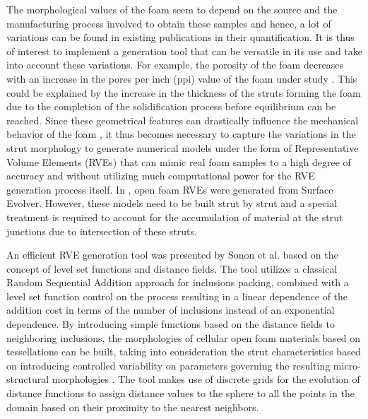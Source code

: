 The morphological values of the foam seem to depend on the source and the manufacturing process involved to obtain these samples and hence, a lot of variations can be found in existing publications in their quantification. It is thus of interest to implement a generation tool that can be versatile in its use and take into account these variations. For example, the porosity of the foam decreases with an increase in the pores per inch (ppi) value of the foam under study \cite{jungMicrostructuralCharacterisationExperimental2017}. This could be explained by the increase in the thickness of the struts forming the foam due to the completion of the solidification process before equilibrium can be reached. {Since these geometrical features can drastically influence the mechanical behavior of the foam \cite{jungMicrostructuralCharacterisationExperimental2017,gongCompressiveResponseOpencell2005}, it thus becomes necessary to capture the variations in the strut morphology to generate numerical models under the form of Representative Volume Elements (RVEs) that can mimic real foam samples to a high degree of accuracy and without utilizing much computational power for the RVE generation process itself.} {In \cite{jangCompressiveStrengthOpencell2010}, open foam RVEs were generated from Surface Evolver. However, these models need to be built strut by strut and a special treatment is required to account for the accumulation of material at the strut junctions due to intersection of these struts.}

An efficient RVE generation tool was presented by Sonon et al. \cite{sononUnifiedLevelSet2012} based on the concept of level set functions and distance fields. The tool utilizes a classical Random Sequential Addition approach for inclusions packing, combined with a level set function control on the process resulting in a linear dependence of the addition cost  in terms of the number of inclusions instead of an exponential dependence. By introducing simple functions based on the distance fields to neighboring inclusions, the morphologies of cellular open foam materials based on tessellations can be built, taking into consideration the strut characteristics based on introducing controlled variability on parameters governing the resulting micro-structural morphologies \cite{sononAdvancedApproachGeneration2015}. The tool makes use of discrete grids for the evolution of distance functions to assign distance values to the sphere to all the points in the domain based on their proximity to the nearest neighbors. 

